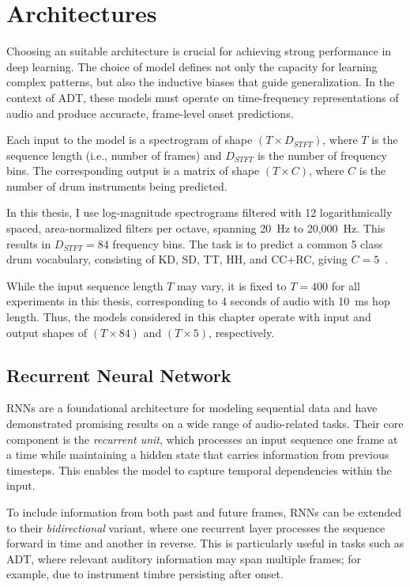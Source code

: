 \chapter{Architectures}\label{Architectures}

Choosing an suitable architecture is crucial for achieving strong performance in deep learning. The choice of model defines not only the capacity for learning complex patterns, but also the inductive biases that guide generalization. In the context of \gls{ADT}, these models must operate on time-frequency representations of audio and produce accuracte, frame-level onset predictions.

Each input to the model is a spectrogram of shape $(T \times D_{STFT})$, where $T$ is the sequence length (i.e., number of frames) and $D_{STFT}$ is the number of frequency bins. The corresponding output is a matrix of shape $(T \times C)$, where $C$ is the number of drum instruments being predicted.

In this thesis, I use log-magnitude spectrograms filtered with 12 logarithmically spaced, area-normalized filters per octave, spanning 20~Hz to 20,000~Hz. This results in $D_{STFT} = 84$ frequency bins. The task is to predict a common 5 class drum vocabulary, consisting of \acrfull{KD}, \acrfull{SD}, \acrfull{TT}, \acrfull{HH}, and \acrfull{CC+RC}, giving $C = 5$~\cite{zehren2024analyzingreducingsynthetictorealtransfer}.

While the input sequence length $T$ may vary, it is fixed to $T = 400$ for all experiments in this thesis, corresponding to 4 seconds of audio with 10~ms hop length. Thus, the models considered in this chapter operate with input and output shapes of $(T \times 84)$ and $(T \times 5)$, respectively.

\section{Recurrent Neural Network}

\glspl{RNN} are a foundational architecture for modeling sequential data and have demonstrated promising results on a wide range of audio-related tasks. Their core component is the \textit{recurrent unit}, which processes an input sequence one frame at a time while maintaining a hidden state that carries information from previous timesteps. This enables the model to capture temporal dependencies within the input.

To include information from both past and future frames, \glspl{RNN} can be extended to their \textit{bidirectional} variant, where one recurrent layer processes the sequence forward in time and another in reverse. This is particularly useful in tasks such as \gls{ADT}, where relevant auditory information may span multiple frames; for example, due to instrument timbre persisting after onset.

